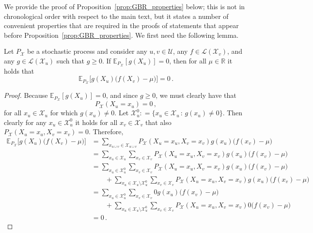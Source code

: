 \documentclass[twoside,11pt]{article}
\newcommand{\reals}{\mathbb{R}}
\newcommand{\states}{\mathcal{X}}
\newcommand{\gambles}{\mathcal{L}}
\newcommand{\coloneqq}{:\!=}
\begin{document}
We provide the proof of Proposition~\ref{prop:GBR_properties} below; this is not in chronological order with respect to the main text, but it states a number of convenient properties that are required in the proofs of statements that appear before Proposition~\ref{prop:GBR_properties}. We first need the following lemma.

\begin{lemma}\label{lemma:conditioning_zero_means_bayes_zero}
Let $P_\states$ be a stochastic process and consider any $u,v\in\mathcal{U}$, any $f\in\gambles(\states_v)$, and any $g\in\gambles(\states_u)$ such that $g\geq 0$. If $\mathbb{E}_{P_\states}[g(X_u)]=0$, then for all $\mu\in\reals$ it holds that
\begin{equation*}
\mathbb{E}_{P_\states}\bigl[g(X_u)\bigl(f(X_v) - \mu\bigr)\bigr]=0\,.
\end{equation*}
\end{lemma}
\begin{proof}
Because $\mathbb{E}_{P_\states}[g(X_u)]=0$, and since $g\geq 0$, we must clearly have that
\begin{equation*}
P_\states(X_u=x_u) = 0\,,
\end{equation*}
for all $x_u\in\states_u$ for which $g(x_u)\neq 0$. Let $\states_u^0\coloneqq\{x_u\in\states_u\,:\,g(x_u)\neq 0\}$. Then clearly for any $x_u\in\states_u^0$ it holds for all $x_v\in\states_v$ that also $P_\states(X_u=x_u,X_v=x_v)=0$. Therefore,
\begin{align*}
\mathbb{E}_{P_\states}\bigl[g(X_u)\bigl(f(X_v) - \mu\bigr)\bigr] &= \sum_{x_{u\cup v}\in\states_{u\cup v}} P_\states(X_u=x_u,X_v=x_v)g(x_u)\bigl(f(x_v) - \mu\bigr) \\
 &= \sum_{x_{u}\in\states_{u}}\sum_{x_v\in\states_v} P_\states(X_u=x_u,X_v=x_v)g(x_u)\bigl(f(x_v) - \mu\bigr) \\
 &= \sum_{x_{u}\in\states_u^0}\sum_{x_v\in\states_v} P_\states(X_u=x_u,X_v=x_v)g(x_u)\bigl(f(x_v) - \mu\bigr) \\
 &\quad\quad + \sum_{x_{u}\in\states_{u}\setminus \states_u^0}\sum_{x_v\in\states_v} P_\states(X_u=x_u,X_v=x_v)g(x_u)\bigl(f(x_v) - \mu\bigr) \\
 &= \sum_{x_{u}\in\states_u^0}\sum_{x_v\in\states_v} 0g(x_u)\bigl(f(x_v) - \mu\bigr) \\
 &\quad\quad + \sum_{x_{u}\in\states_{u}\setminus \states_u^0}\sum_{x_v\in\states_v} P_\states(X_u=x_u,X_v=x_v)0\bigl(f(x_v) - \mu\bigr) \\
 &= 0\,.
\end{align*}
\end{proof}
\end{document}

